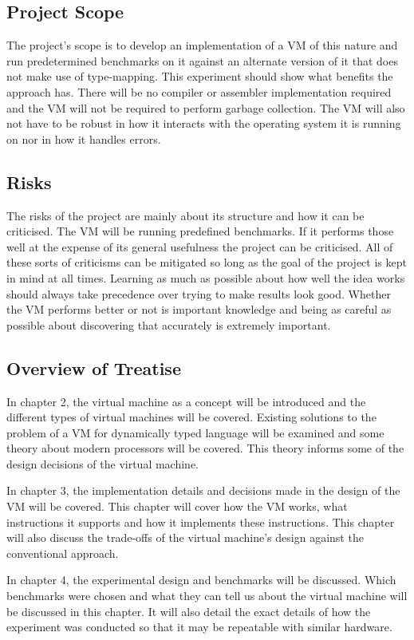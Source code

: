 \documentclass[english,a4paper]{article}
\begin{document}
\subsection{Project Scope}

The project's scope is to develop an implementation of a VM of this
nature and run predetermined benchmarks on it against an alternate
version of it that does not make use of type-mapping. This experiment
should show what benefits the approach has. There will be no compiler
or assembler implementation required and the VM will not be required
to perform garbage collection. The VM will also not have to be robust
in how it interacts with the operating system it is running on nor in
how it handles errors.

\subsection{Risks}
The risks of the project are mainly about its structure and how it can
be criticised. The VM will be running predefined benchmarks. If it
performs those well at the expense of its general usefulness the
project can be criticised. All of these sorts of criticisms can be
mitigated so long as the goal of the project is kept in mind at all
times. Learning as much as possible about how well the idea works
should always take precedence over trying to make results look
good. Whether the VM performs better or not is important knowledge and
being as careful as possible about discovering that accurately is
extremely important.

\subsection{Overview of Treatise}
In chapter 2, the virtual machine as a concept will be introduced and
the different types of virtual machines will be covered. Existing
solutions to the problem of a VM for dynamically typed language will
be examined and some theory about modern processors will be
covered. This theory informs some of the design decisions of the
virtual machine.

In chapter 3, the implementation details and decisions made in the
design of the VM will be covered. This chapter will cover how the VM
works, what instructions it supports and how it implements these
instructions. This chapter will also discuss the trade-offs of the
virtual machine's design against the conventional approach.

In chapter 4, the experimental design and benchmarks will be
discussed. Which benchmarks were chosen and what they can tell us
about the virtual machine will be discussed in this chapter. It will
also detail the exact details of how the experiment was conducted so
that it may be repeatable with similar hardware.
\end{document}

